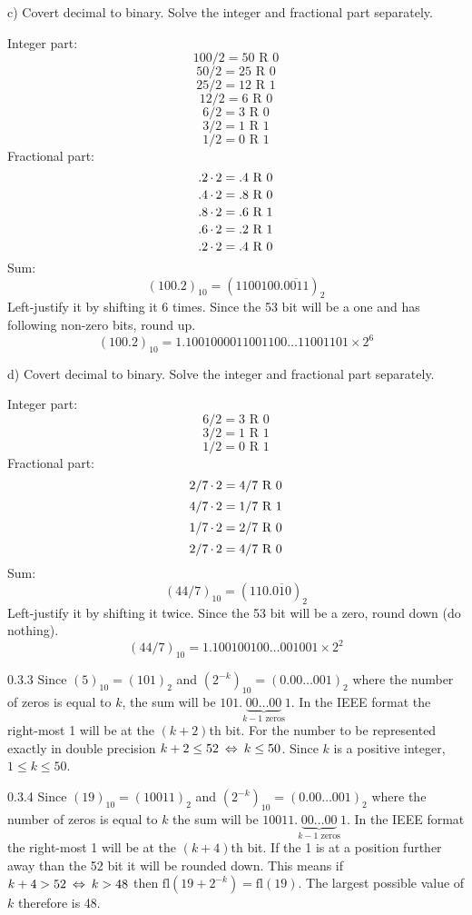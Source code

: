 \begin{task}{c)}
Covert decimal to binary. Solve the integer and fractional part separately.

Integer part:
\[100/2=50\text{ R }0\]
\[50/2=25\text{ R }0\]
\[25/2=12\text{ R }1\]
\[12/2=6\text{ R }0\]
\[6/2=3\text{ R }0\]
\[3/2=1\text{ R }1\]
\[1/2=0\text{ R }1\]
Fractional part:
\[.2\operatorname{\cdot}2=.4\text{ R }0\]
\[.4\operatorname{\cdot}2=.8\text{ R }0\]
\[.8\operatorname{\cdot}2=.6\text{ R }1\]
\[.6\operatorname{\cdot}2=.2\text{ R }1\]
\[.2\operatorname{\cdot}2=.4\text{ R }0\]
Sum:
\[(100.2)_{10}=(1100100.\overline{0011})_2\]
Left-justify it by shifting it 6 times. Since the 53 bit will be a one and has following non-zero bits, round up.
\[(100.2)_{10}=1.1001000011001100\ldots11001101 \times 2^{6}\]
\end{task}

\begin{task}{d)}
Covert decimal to binary. Solve the integer and fractional part separately.

Integer part:
\[6/2=3\text{ R }0\]
\[3/2=1\text{ R }1\]
\[1/2=0\text{ R }1\]
Fractional part:
\[2/7\operatorname{\cdot}2=4/7\text{ R }0\]
\[4/7\operatorname{\cdot}2=1/7\text{ R }1\]
\[1/7\operatorname{\cdot}2=2/7\text{ R }0\]
\[2/7\operatorname{\cdot}2=4/7\text{ R }0\]
Sum:
\[(44/7)_{10}=(110.\overline{010})_2\]
Left-justify it by shifting it twice. Since the 53 bit will be a zero, round down (do nothing).
\[(44/7)_{10}=1.100100100\ldots001001 \times 2^{2}\]
\end{task}

\begin{task}{0.3.3}
Since $(5)_{10}=(101)_2$ and $(2^{-k})_{10}=(0.00\ldots001)_2$ where the number of zeros is equal to $k$, the sum will be $101.\underbrace{00\ldots00}_{k - 1 \text{ zeros}}1$. In the IEEE format the right-most 1 will be at the $(k+2)$th bit. For the number to be represented exactly in double precision $k+2 \le 52 \lra k \le 50$. Since $k$ is a positive integer, $1 \le k \le 50$.
\end{task}

\begin{task}{0.3.4}
Since $(19)_{10}=(10011)_2$ and $(2^{-k})_{10}=(0.00\ldots001)_2$ where the number of zeros is equal to $k$ the sum will be $10011.\underbrace{00\ldots00}_{k - 1 \text{ zeros}}1$. In the IEEE format the right-most 1 will be at the $(k+4)$th bit. If the 1 is at a position further away than the 52 bit it will be rounded down. This means if $k+4 > 52 \lra k > 48$ then $\text{fl}(19+2^{-k})=\text{fl}(19)$. The largest possible value of $k$ therefore is 48.
\end{task}

